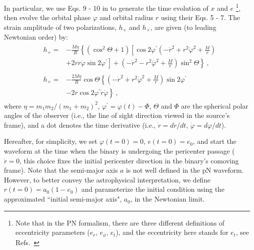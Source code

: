 \documentclass[%
 reprint,
 amsmath,amssymb,
 aps,
]{revtex4-2}
\begin{document}
In particular, we use Eqs. 9 - 10 in \citet{Hinder+10} to generate the time evolution of $x$ and $e$ \footnote{Note that in the PN formalism, there are three different definitions of eccentricity parameters ($e_r,\,e_\phi,\,e_t$), and the eccentricity here stands for $e_t$, see Refs.~\citep{Damour1985,Damour1986,Blanchet_2002,Hinder+10,Knee2022ecc}}, then evolve the orbital phase $\varphi$ and orbital radius $r$ using their Eqs. 5 - 7. The strain amplitude of two polarizations, $h_{+}$ and $h_{\times}$, are given (to leading Newtonian order) by:
\begin{equation}
\begin{aligned}
&\begin{aligned}
h_{+}= & -\frac{M \eta}{R}\left\{( \operatorname { c o s } ^ { 2 } \Theta + 1 ) \left[\cos 2 \varphi^{\prime}\left(-\dot{r}^2+r^2 \dot{\varphi}^2+\frac{M}{r}\right)\right.\right. \\
& \left.\left.+2 r \dot{r} \dot{\varphi} \sin 2 \varphi^{\prime}\right]+\left(-\dot{r}^2-r^2 \dot{\varphi}^2+\frac{M}{r}\right) \sin ^2 \Theta\right\} \ ,
\end{aligned}\\
&\begin{aligned}
h_{\times}= & -\frac{2 M \eta}{R} \cos \Theta\left\{\left(-\dot{r}^2+r^2 \dot{\varphi}^2+\frac{M}{r}\right) \sin 2 \varphi^{\prime}\right. \\
& \left.-2 r \cos 2 \varphi^{\prime} \dot{r} \dot{\varphi}\right\} \ , \label{eq:strains}
\end{aligned}
\end{aligned}
\end{equation}
where $\eta=m_1m_2/(m_1+m_2)^2$, $\varphi^{\prime}=\varphi(t)-\Phi$, $\Theta$ and $\Phi$ are the spherical polar
angles of the observer (i.e., the line of sight direction viewed in the source's frame), and a dot denotes the time derivative (i.e., $\dot{r}=dr/dt,\,\dot{\varphi}=d\varphi/dt$). 

Hereafter, for simplicity, we set $\varphi(t=0)=0$, $e(t=0)=e_0$, and start the waveform at the time when the binary is undergoing the pericenter passage ($\dot{r}=0$, this choice fixes the initial pericenter direction in the binary's comoving frame). Note that the semi-major axis $a$ is not well defined in the pN waveform. However, to better convey the astrophysical interpretation, we define $r(t=0)=a_0(1-e_0)$ and parameterize the initial condition using the approximated ``initial semi-major axis", $a_0$, in the Newtonian limit.
\end{document}
